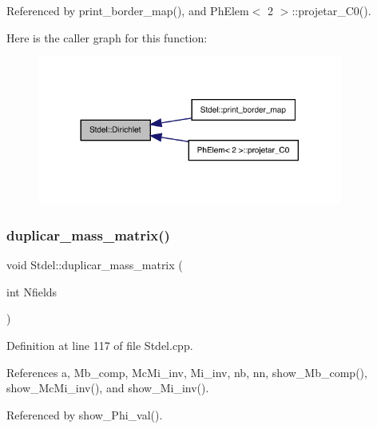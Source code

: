 Referenced by print\+\_\+border\+\_\+map(), and Ph\+Elem$<$ 2 $>$\+::projetar\+\_\+\+C0().

Here is the caller graph for this function\+:
\nopagebreak
\begin{figure}[H]
\begin{center}
\leavevmode
\includegraphics[width=284pt]{classStdel_a92e13b000249ba73b35407d925cbd7a8_icgraph}
\end{center}
\end{figure}
\mbox{\label{classStdel_a922b779be1f8f12b7a5535ab529bff64}} 
\subsubsection{\texorpdfstring{duplicar\+\_\+mass\+\_\+matrix()}{duplicar\_mass\_matrix()}}
{\footnotesize\ttfamily void Stdel\+::duplicar\+\_\+mass\+\_\+matrix (\begin{DoxyParamCaption}\item[{int}]{Nfields }\end{DoxyParamCaption})}



Definition at line 117 of file Stdel.\+cpp.



References a, Mb\+\_\+comp, Mc\+Mi\+\_\+inv, Mi\+\_\+inv, nb, nn, show\+\_\+\+Mb\+\_\+comp(), show\+\_\+\+Mc\+Mi\+\_\+inv(), and show\+\_\+\+Mi\+\_\+inv().



Referenced by show\+\_\+\+Phi\+\_\+val().

